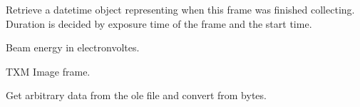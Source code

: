 \documentclass[letterpaper,10pt,english]{sphinxmanual}
\begin{document}
\begin{fulllineitems}

\begin{fulllineitems}
\label{\detokenize{xanespy:xanespy.xradia.XRMFile.endtime}}
Retrieve a datetime object representing when this frame was
finished collecting. Duration is decided by exposure time of the frame
and the start time.

\end{fulllineitems}


\begin{fulllineitems}
\label{\detokenize{xanespy:xanespy.xradia.XRMFile.energy}}
Beam energy in electronvoltes.

\end{fulllineitems}


\begin{fulllineitems}
\label{\detokenize{xanespy:xanespy.xradia.XRMFile.image_data}}
TXM Image frame.

\end{fulllineitems}


\begin{fulllineitems}
\label{\detokenize{xanespy:xanespy.xradia.XRMFile.image_dtype}}
\end{fulllineitems}


\begin{fulllineitems}
\label{\detokenize{xanespy:xanespy.xradia.XRMFile.image_shape}}
\end{fulllineitems}


\begin{fulllineitems}
\label{\detokenize{xanespy:xanespy.xradia.XRMFile.ole_value}}
Get arbitrary data from the ole file and convert from bytes.


\end{fulllineitems}
\end{fulllineitems}
\end{document}
